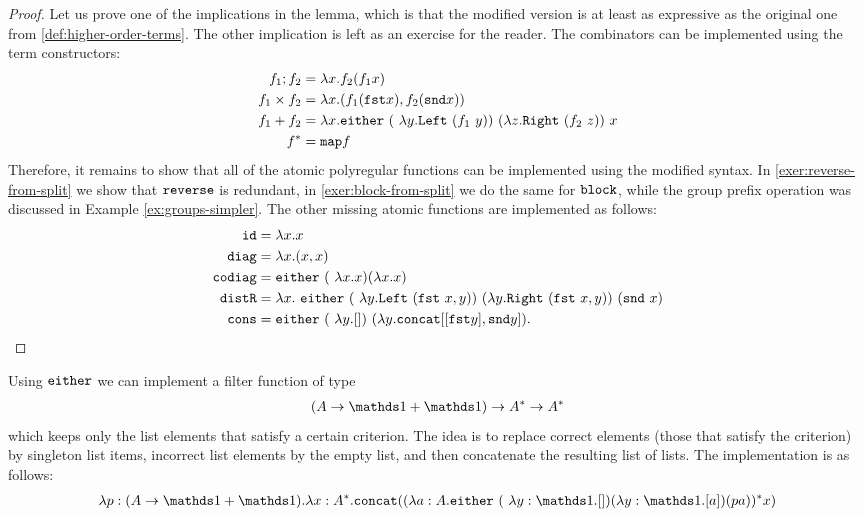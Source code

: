 \begin{proof} Let us prove one of the implications in the lemma, which is that the modified version is at least as expressive as the original one from \cref{def:higher-order-terms}. The other implication is left as an exercise for the reader. The combinators can be implemented using the term constructors: 
    \begin{align*}
    f_1; f_2 & =  \lambda x. f_2 (f_1 x)\\
    f_1 \times f_2 & =  \lambda x. (f_1 (\fstterm x), f_2 (\sndterm x))\\
    f_1 + f_2 & =  \lambda x. \either (\lambda y. \leftterm\ (f_1\ y))\ (\lambda z. \rightterm\ (f_2\ z))\ x \\
    f^* & = \mapterm f 
    \end{align*}
    Therefore, it remains to show that all of the atomic polyregular functions can be implemented using the modified syntax. In \cref{exer:reverse-from-split} we show that $\mathtt{reverse}$ is redundant, in \cref{exer:block-from-split} we do the same for $\mathtt{block}$, while the group prefix operation was discussed in  Example \ref{ex:groups-simpler}. The other missing atomic functions are implemented as follows:
         \begin{align*}
        \idterm  &=  \lambda x.x \\
        \diagterm  & = \lambda x. (x,x) \\
        \codiagterm & = \either (\lambda x.x) (\lambda x.x) \\
        \distrterm & = \lambda x.\  \either 
        (\lambda y. \leftterm\ (\fstterm\ x, y))\  
        (\lambda y. \rightterm\ (\fstterm\ x, y))\ 
        (\sndterm\ x) \\
        \consterm  & = \either (\lambda y. [])\ 
        (\lambda y. \concatterm [ [\fstterm y], \sndterm y] ) .
    \end{align*}
\end{proof}



\begin{myexample}
    [Filter] \label{ex:filter} Using $\mathtt{either}$ we can  implement  a filter function  of type 
    \begin{align*}
    (A \to \onetype + \onetype) \to A^* \to   A^*
    \end{align*}
    which keeps only the list elements that satisfy a certain criterion. The idea is to replace correct elements (those that satisfy the criterion) by singleton list items, incorrect list elements by the empty list, and then concatenate the resulting list of lists. The implementation is as follows:
    \begin{align*}
    \lambda p : (A \to \onetype + \onetype). \lambda x : A^*. \concatterm ((\lambda a : A. \either (\lambda y : \onetype. []) (\lambda y : \onetype. [a]) (p a))^* x)
    \end{align*}
\end{myexample}


